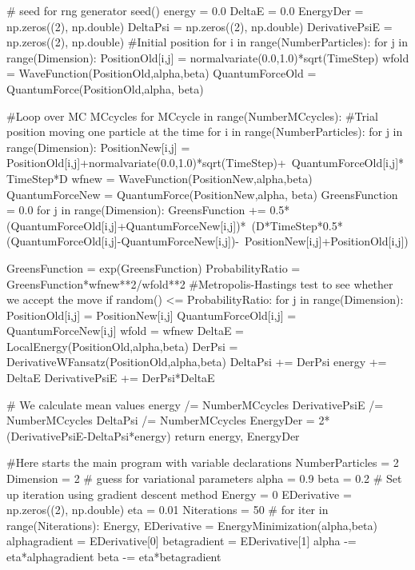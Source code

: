 \documentclass[%
oneside,                 %
final,                   %
10pt]{article}
\begin{document}
    # seed for rng generator 
    seed()
    energy = 0.0
    DeltaE = 0.0
    EnergyDer = np.zeros((2), np.double)
    DeltaPsi = np.zeros((2), np.double)
    DerivativePsiE = np.zeros((2), np.double)
    #Initial position
    for i in range(NumberParticles):
        for j in range(Dimension):
            PositionOld[i,j] = normalvariate(0.0,1.0)*sqrt(TimeStep)
    wfold = WaveFunction(PositionOld,alpha,beta)
    QuantumForceOld = QuantumForce(PositionOld,alpha, beta)

    #Loop over MC MCcycles
    for MCcycle in range(NumberMCcycles):
        #Trial position moving one particle at the time
        for i in range(NumberParticles):
            for j in range(Dimension):
                PositionNew[i,j] = PositionOld[i,j]+normalvariate(0.0,1.0)*sqrt(TimeStep)+\
                                       QuantumForceOld[i,j]*TimeStep*D
            wfnew = WaveFunction(PositionNew,alpha,beta)
            QuantumForceNew = QuantumForce(PositionNew,alpha, beta)
            GreensFunction = 0.0
            for j in range(Dimension):
                GreensFunction += 0.5*(QuantumForceOld[i,j]+QuantumForceNew[i,j])*\
	                              (D*TimeStep*0.5*(QuantumForceOld[i,j]-QuantumForceNew[i,j])-\
                                      PositionNew[i,j]+PositionOld[i,j])
      
            GreensFunction = exp(GreensFunction)
            ProbabilityRatio = GreensFunction*wfnew**2/wfold**2
            #Metropolis-Hastings test to see whether we accept the move
            if random() <= ProbabilityRatio:
                for j in range(Dimension):
                    PositionOld[i,j] = PositionNew[i,j]
                    QuantumForceOld[i,j] = QuantumForceNew[i,j]
                wfold = wfnew
        DeltaE = LocalEnergy(PositionOld,alpha,beta)
        DerPsi = DerivativeWFansatz(PositionOld,alpha,beta)
        DeltaPsi += DerPsi
        energy += DeltaE
        DerivativePsiE += DerPsi*DeltaE
            
    # We calculate mean values
    energy /= NumberMCcycles
    DerivativePsiE /= NumberMCcycles
    DeltaPsi /= NumberMCcycles
    EnergyDer  = 2*(DerivativePsiE-DeltaPsi*energy)
    return energy, EnergyDer


#Here starts the main program with variable declarations
NumberParticles = 2
Dimension = 2
# guess for variational parameters
alpha = 0.9
beta = 0.2
# Set up iteration using gradient descent method
Energy = 0
EDerivative = np.zeros((2), np.double)
eta = 0.01
Niterations = 50
# 
for iter in range(Niterations):
    Energy, EDerivative = EnergyMinimization(alpha,beta)
    alphagradient = EDerivative[0]
    betagradient = EDerivative[1]
    alpha -= eta*alphagradient
    beta -= eta*betagradient 
\end{document}
